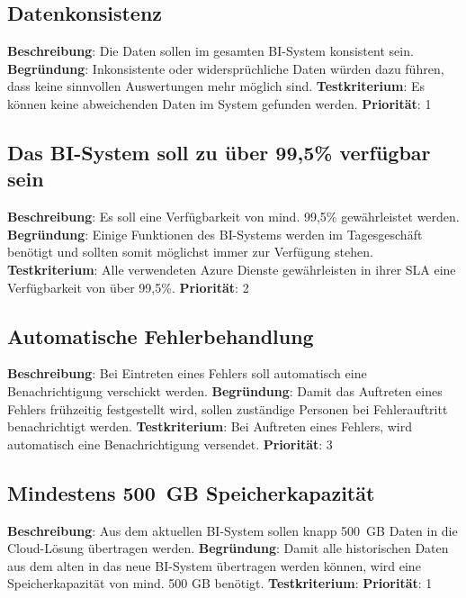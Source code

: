 \subsection{Datenkonsistenz} \label{sec:anforderungsspezifikation:Datenkonsistenz}
\textbf{Beschreibung}: Die Daten sollen im gesamten BI-System konsistent sein.
\newline \textbf{Begründung}: Inkonsistente oder widersprüchliche Daten würden dazu führen, dass keine sinnvollen Auswertungen mehr möglich sind.
\newline \textbf{Testkriterium}: Es können keine abweichenden Daten im System gefunden werden.
\newline \textbf{Priorität}: 1

\subsection{Das BI-System soll zu über 99,5\% verfügbar sein} \label{sec:anforderungsspezifikation:verfügbarkeit}
\textbf{Beschreibung}:  Es soll eine Verfügbarkeit von mind. 99,5\% gewährleistet werden. 
\newline \textbf{Begründung}: Einige Funktionen des BI-Systems werden im Tagesgeschäft benötigt und sollten somit möglichst immer zur Verfügung stehen.
\newline \textbf{Testkriterium}: Alle verwendeten Azure Dienste gewährleisten in ihrer SLA eine Verfügbarkeit von über 99,5\%.
\newline \textbf{Priorität}: 2

\subsection{Automatische Fehlerbehandlung} \label{sec:anforderungsspezifikation:AutomatischeFehlerbehandlung}
\textbf{Beschreibung}: Bei Eintreten eines Fehlers soll automatisch eine Benachrichtigung verschickt werden. 
\newline \textbf{Begründung}: Damit das Auftreten eines Fehlers frühzeitig festgestellt wird, sollen zuständige Personen bei Fehlerauftritt benachrichtigt werden.
\newline \textbf{Testkriterium}: Bei Auftreten eines Fehlers, wird automatisch eine Benachrichtigung versendet.
\newline \textbf{Priorität}: 3

\subsection{Mindestens 500 GB Speicherkapazität} \label{sec:anforderungsspezifikation:speicherkapazität}
\textbf{Beschreibung}: Aus dem aktuellen BI-System sollen knapp 500 GB Daten in die Cloud-Lösung übertragen werden.
\newline \textbf{Begründung}: Damit alle historischen Daten aus dem alten in das neue BI-System übertragen werden können, wird eine Speicherkapazität von mind. 500 GB benötigt.
\newline \textbf{Testkriterium}: 
\newline \textbf{Priorität}: 1

